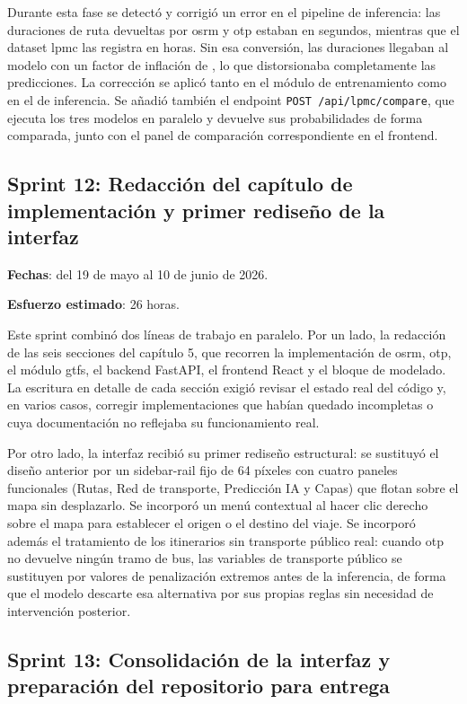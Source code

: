 Durante esta fase se detectó y corrigió un error en el pipeline de inferencia: las duraciones de ruta devueltas por \gls{osrm} y \gls{otp} estaban en segundos, mientras que el dataset \gls{lpmc} las registra en horas. Sin esa conversión, las duraciones llegaban al modelo con un factor de inflación de , lo que distorsionaba completamente las predicciones. La corrección se aplicó tanto en el módulo de entrenamiento como en el de inferencia. Se añadió también el endpoint \texttt{POST /api/lpmc/compare}, que ejecuta los tres modelos en paralelo y devuelve sus probabilidades de forma comparada, junto con el panel de comparación correspondiente en el frontend.

\subsection{Sprint 12: Redacción del capítulo de implementación y primer rediseño de la interfaz}

\textbf{Fechas}: del 19 de mayo al 10 de junio de 2026.

\textbf{Esfuerzo estimado}: 26 horas.\newline

Este sprint combinó dos líneas de trabajo en paralelo. Por un lado, la redacción de las seis secciones del capítulo 5, que recorren la implementación de \gls{osrm}, \gls{otp}, el módulo \gls{gtfs}, el backend FastAPI, el frontend React y el bloque de modelado. La escritura en detalle de cada sección exigió revisar el estado real del código y, en varios casos, corregir implementaciones que habían quedado incompletas o cuya documentación no reflejaba su funcionamiento real.\newline

Por otro lado, la interfaz recibió su primer rediseño estructural: se sustituyó el diseño anterior por un sidebar-rail fijo de 64 píxeles con cuatro paneles funcionales (Rutas, Red de transporte, Predicción IA y Capas) que flotan sobre el mapa sin desplazarlo. Se incorporó un menú contextual al hacer clic derecho sobre el mapa para establecer el origen o el destino del viaje. Se incorporó además el tratamiento de los itinerarios sin transporte público real: cuando \gls{otp} no devuelve ningún tramo de bus, las variables de transporte público se sustituyen por valores de penalización extremos antes de la inferencia, de forma que el modelo descarte esa alternativa por sus propias reglas sin necesidad de intervención posterior.


\subsection{Sprint 13: Consolidación de la interfaz y preparación del repositorio para entrega}

